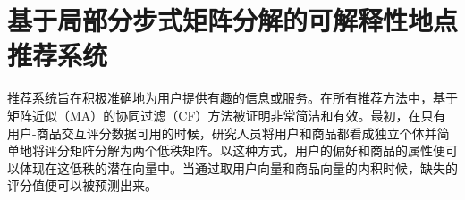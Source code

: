 
\chapter{基于局部分步式矩阵分解的可解释性地点推荐系统}
\label{chapter:main3}

推荐系统旨在积极准确地为用户提供有趣的信息或服务。在所有推荐方法中，基于矩阵近似（MA）的协同过滤（CF）方法被证明非常简洁和有效。最初，在只有用户-商品交互评分数据可用的时候，研究人员将用户和商品都看成独立个体并简单地将评分矩阵分解为两个低秩矩阵\cite{paterek2007improving,weightedSVD,mnih2008probabilistic,rennie2005fast,salakhutdinov2008bayesian}。以这种方式，用户的偏好和商品的属性便可以体现在这低秩的潜在向量中。当通过取用户向量和商品向量的内积时候，缺失的评分值便可以被预测出来。


\section{}



